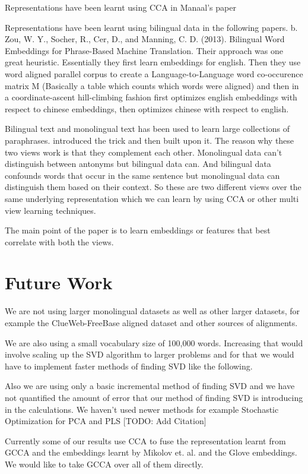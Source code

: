 \documentclass[11pt]{article}
\begin{document}
Representations have been learnt using CCA in Manaal's paper 

Representations have been learnt using bilingual data in the following
papers. b. Zou, W. Y., Socher, R., Cer, D., and Manning, C. D. (2013).  Bilingual Word Embeddings for Phrase-Based Machine Translation. Their approach was one great heuristic. Essentially they first learn embeddings for english. Then they use word aligned parallel corpus to create a Language-to-Language word co-occurence matrix M (Basically a table which counts which words were aligned) and then in a coordinate-ascent hill-climbing fashion first optimizes english embeddings with respect to chinese embeddings, then optimizes chinese with respect to english.

Bilingual text and monolingual text has been used to learn large
collections of paraphrases. \cite{bannard2005paraphrasing} introduced the trick and
then \cite{ganitkevitch2013ppdb} built upon it. The reason why these two views work is
that they complement each other. Monolingual data can't distinguish
between antonyms but bilingual data can. And bilingual data confounds
words that occur in the same sentence but monolingual data can
distinguish them based on their context. So these are two different
views over the same underlying representation which we can learn by
using CCA or other multi view learning techniques.

The main point of the paper is to learn embeddings or features
that best correlate with both the views. 

\section{Future Work}
We are not using larger monolingual datasets as well as other larger
datasets, for example the ClueWeb-FreeBase aligned dataset and other
sources of alignments.

We are also using a small vocabulary size of 100,000 words. Increasing
that would involve scaling up the SVD algorithm to 
larger problems and for that we would have to implement faster methods
of finding SVD like the following.

Also we are using only a basic incremental method of finding SVD and we have not quantified the amount of error that our
method of finding SVD is introducing in the calculations. 
We haven't used newer methods for example Stochastic Optimization for
PCA and PLS [TODO: Add Citation]

Currently some of our results use CCA to fuse the representation learnt from GCCA and the embeddings learnt by Mikolov et. al. and the Glove embeddings.
We would like to take GCCA over all of them directly.
\end{document}
